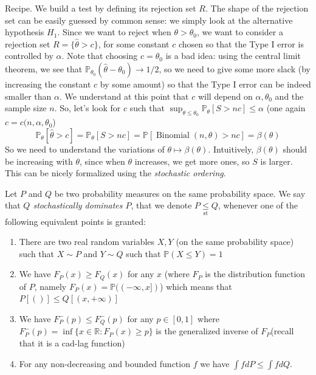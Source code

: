 \documentclass[
	fontsize=11pt, %
	twoside=false, %
	numbers=noenddot, %
]{kaobook}
\DeclareMathOperator{\bin}{Binomial}
\renewcommand{\P}{\mathbb P}
\newcommand{\R}{\mathbb R}
\newcommand{\wh}{\widehat}
\newcommand{\goes}{\rightarrow}
\newcommand{\lest}{\underset{\text{st}}{\leq}}
\begin{document}
Recipe. We build a test by defining its rejection set $R$. The shape of the rejection set can be easily guessed by common sense: we simply look at the alternative hypothesis $H_1$. 
Since we want to reject when $\theta > \theta_0$, we want to consider a rejection set $R = \{ \wh \theta > c \}$, for some constant $c$ chosen so that the Type I error is controlled by $\alpha$.
Note that choosing $c = \theta_0$ is a bad idea: using the central limit theorem, we see that $\P_{\theta_0}(\wh \theta - \theta_0) \goes 1/2$, so we need to give some more slack (by increasing the constant $c$ by some amount) so that the Type I error can be indeed smaller than $\alpha$.
We understand at this point that $c$ will depend on $\alpha, \theta_0$ and the sample size $n$.
So, let's look for $c$ such that $\sup_{\theta \leq \theta_0} \P_\theta[S > n c] \leq \alpha$ (one again $c = c(n, \alpha, \theta_0$)
\begin{equation*}
	\P_\theta[\wh \theta > c] = \P_\theta[S > n c] = \P [\bin(n, \theta) > nc] = \beta(\theta)
\end{equation*}
So we need to understand the variations of $\theta \mapsto \beta(\theta)$.
Intuitively, $\beta(\theta)$ should be increasing with $\theta$, since when $\theta$ increases, we get more ones, so $S$ is larger.
This can be nicely formalized using the \emph{stochastic ordering}.
\begin{definition}
	Let $P$ and $Q$ be two probability measures on the same probability space. We say that \emph{$Q$ stochastically dominates $P$}, that we denote $P \lest Q$, whenever one of the following equivalent points is granted:
	\begin{enumerate}
		\item There are two real random variables $X, Y$ (on the same probability space) such that $X \sim P$ and $Y \sim Q$ such that $\P(X \leq Y) = 1$
		\item We have $F_P(x) \geq F_Q(x)$ for any $x$ (where $F_P$ is the distribution function of $P$, namely $F_P(x) = \P((-\infty, x])$) which means that $P[()] \leq Q[(x, +\infty)]$
		\item We have $F_P^-(p) \leq F_Q^-(p)$ for any $p \in [0, 1]$ where $F_P^-(p) = \inf \{ x \in \R : F_P(x) \geq p \}$ is the generalized inverse of $F_P$(recall that it is a cad-lag function)
		\item For any non-decreasing and bounded function $f$ we have $\int f dP \leq \int f dQ$.
	\end{enumerate}
\end{definition}
\end{document}
